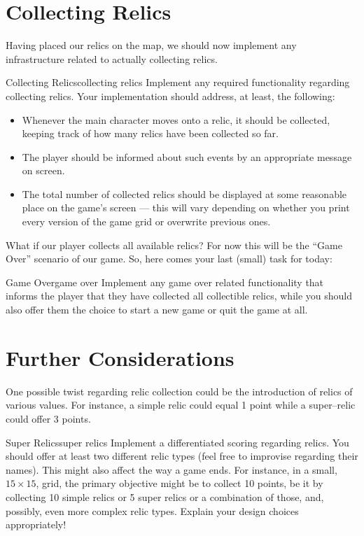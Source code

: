 \documentclass[a4paper, 11pt]{article}
\numberwithin{equation}{section}
\theoremstyle{definition}
\begin{document}
	\section{Collecting Relics}
	Having placed our relics on the map, we should now implement any infrastructure related to actually collecting relics.
	\begin{task}{Collecting Relics}{collecting relics}
		Implement any required functionality regarding collecting relics. Your implementation should address, at least, the following:
		\begin{itemize}
			\item Whenever the main character moves onto a relic, it should be collected, keeping track of how many relics have been collected so far.
			\item The player should be informed about such events by an appropriate message on screen.
			\item The total number of collected relics should be displayed at some reasonable place on the game's screen --- this will vary depending on whether you print every version of the game grid or overwrite previous ones.
		\end{itemize}
	\end{task}
	
	What if our player collects all available relics? For now this will be the ``Game Over'' scenario of our game. So, here comes your last (small) task for today:
	\begin{task}{Game Over}{game over}
		Implement any game over related functionality that informs the player that they have collected all collectible relics, while you should also offer them the choice to start a new game or quit the game at all.
	\end{task}
	\section{Further Considerations}
	One possible twist regarding relic collection could be the introduction of relics of various values. For instance, a simple relic could equal 1 point while a super--relic could offer 3 points.
	
	\begin{task}{Super Relics}{super relics}
		Implement a differentiated scoring regarding relics. You should offer at least two different relic types (feel free to improvise regarding their names). This might also affect the way a game ends. For instance, in a small, $15\times 15$, grid, the primary objective might be to collect 10 points, be it by collecting 10 simple relics or 5 super relics or a combination of those, and, possibly, even more complex relic types. Explain your design choices appropriately!
	\end{task}
	
\end{document}
